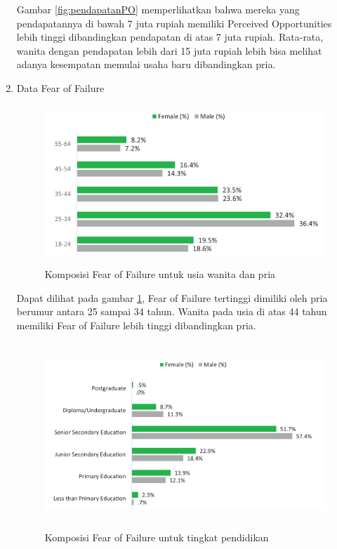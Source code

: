 \begin{enumerate}
Gambar \ref{fig:pendapatanPO} memperlihatkan bahwa mereka yang pendapatannya di bawah 7 juta rupiah memiliki Perceived Opportunities lebih tinggi dibandingkan pendapatan di atas 7 juta rupiah. Rata-rata, wanita dengan pendapatan lebih dari 15 juta rupiah lebih bisa melihat adanya kesempatan memulai usaha baru dibandingkan pria.
	\item Data Fear of Failure
\begin{figure} [H]
	\centering  
	\includegraphics[width=13cm, height=6cm]{usiaFF2013} 
	\caption[Komposisi Fear of Failure untuk usia wanita dan pria]{Komposisi Fear of Failure untuk usia wanita dan pria} 
	\label{fig:umurFF} 
\end{figure} 

Dapat dilihat pada gambar \ref{fig:umurFF}, Fear of Failure tertinggi dimiliki oleh pria berumur antara 25 sampai 34 tahun. Wanita pada usia di atas 44 tahun memiliki Fear of Failure lebih tinggi dibandingkan pria.

\begin{figure} [H]
	\centering  
	\includegraphics[width=13cm, height=7cm]{pendidikanFF2013} 
	\caption[Komposisi Fear of Failure untuk tingkat pendidikan]{Komposisi Fear of Failure untuk tingkat pendidikan} 
	\label{fig:pendidikanFF} 
\end{figure} 


\end{enumerate}
